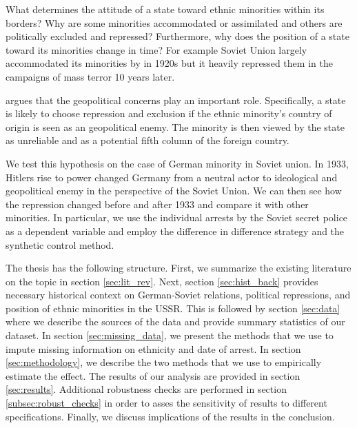 What determines the attitude of a state toward ethnic minorities within
its borders? Why are some minorities accommodated or assimilated and
others are politically excluded and repressed? Furthermore,  why does the
position of a state toward its minorities change in time? For example
Soviet Union largely accommodated its minorities by in 1920s but it
heavily repressed them in the campaigns of  mass terror 10 years later. 

\citet{mylonas_politics_2013} argues that the geopolitical concerns play an important role. Specifically, a state is likely to choose repression and
exclusion if the ethnic minority's country of origin is seen as an
geopolitical enemy. The minority is then viewed by the state as
unreliable and as a potential fifth column of the foreign country.   

We test this hypothesis on the case of German minority in Soviet union.
In 1933, Hitlers rise to power changed Germany from a neutral actor to ideological and geopolitical enemy in the perspective of the Soviet Union. We can then see how the repression changed before and after 1933 and compare it with other minorities. In particular, we use the individual arrests by the Soviet secret police as a dependent variable and employ the difference in difference strategy and the synthetic control method. 

The thesis has the following structure. First, we summarize the existing literature on the topic in section \ref{sec:lit_rev}. Next, section \ref{sec:hist_back} provides necessary historical context on German-Soviet relations, political repressions, and position of ethnic minorities in the USSR. This is followed by section \ref{sec:data} where we describe the sources of the data and provide summary statistics of our  dataset. 
In section \ref{sec:missing_data}, we present the methods that we use to impute missing information on ethnicity and  date of arrest. In section \ref{sec:methodology}, we  describe the two methods that we use to empirically estimate the effect. 
The results of our analysis  are provided in section \ref{sec:results}. Additional robustness checks are performed in section \ref{subsec:robust_checks} in order to asses the sensitivity of results to different specifications. Finally, we discuss implications of the results in the conclusion. 

